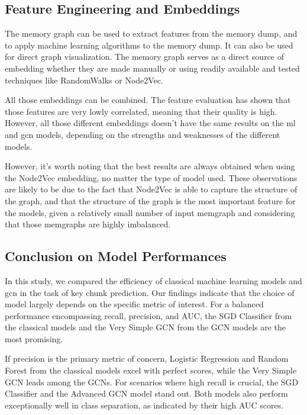\subsection{Feature Engineering and Embeddings}
The memory graph can be used to extract features from the memory dump, and to apply machine learning algorithms to the memory dump. It can also be used for direct graph visualization. The memory graph serves as a direct source of embedding whether they are made manually or using readily available and tested techniques like RandomWalks or Node2Vec.

All those embeddings can be combined. The feature evaluation has shown that those features are very lowly correlated, meaning that their quality is high. However, all those different embeddings doesn't have the same results on the \acrshort{ml} and \acrshort{gcn} models, depending on the strengths and weaknesses of the different models. 

However, it's worth noting that the best results are always obtained when using the Node2Vec embedding, no matter the 
type of model used. These observations are likely to be due to the fact that Node2Vec is able to capture the structure of the graph, and that the structure of the graph is the most important feature for the models, given a relatively small number of input memgraph and considering that those memgraphs are highly imbalanced.

\subsection{Conclusion on Model Performances}

In this study, we compared the efficiency of classical machine learning models and \acrfull{gcn} in the task of key chunk prediction. Our findings indicate that the choice of model largely depends on the specific metric of interest. For a balanced performance encompassing recall, precision, and AUC, the SGD Classifier from the classical models and the Very Simple GCN from the GCN models are the most promising. 

If precision is the primary metric of concern, Logistic Regression and Random Forest from the classical models excel with perfect scores, while the Very Simple GCN leads among the GCNs. For scenarios where high recall is crucial, the SGD Classifier and the Advanced GCN model stand out. Both models also perform exceptionally well in class separation, as indicated by their high AUC scores.

